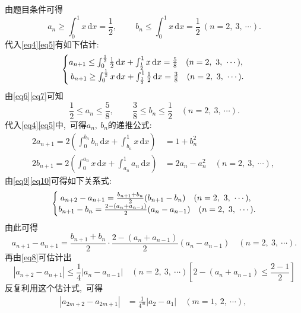 	\begin{solution}
		由题目条件可得
		\begin{equation}
			a_n\ge \int_{0}^{1}x \,\text{d}x=\frac{1}{2},\ \qquad b_n\le \int_{0}^{1}x \,\text{d}x=\frac{1}{2}\ (n=2,\ 3,\ \cdots)\label{eq6}.
		\end{equation}
		代入\eqref{eq4}\eqref{eq5}有如下估计:
		\begin{equation}
			\centering{
				\left\{\begin{matrix} 
					a_{n+1}\le \int_{0}^{\frac{1}{2}}\frac{1}{2}\,\text{d}x + \int_{\frac{1}{2}}^{1}x\,\text{d}x=\frac{5}{8}\quad (n=2,\ 3,\ \cdots),\  \\ 
					b_{n+1}\ge \int_{0}^{\frac{1}{2}}x\,\text{d}x + \int_{\frac{1}{2}}^{1}\frac{1}{2}\,\text{d}x=\frac{3}{8}\quad (n=2,\ 3,\ \cdots).\\  
				\end{matrix}\right. }\label{eq7}
		\end{equation}
		由\eqref{eq6}\eqref{eq7}可知
		\begin{equation}
			\frac{1}{2}\le a_n \le \frac{5}{8},\ \qquad\frac{3}{8}\le b_n\le \frac{1}{2}\quad (n=2,\ 3,\ \cdots).\label{eq8}
		\end{equation}
		代入\eqref{eq4}\eqref{eq5}中,\ 可得$a_n,\ b_n$的递推公式:
		\begin{align}
			2a_{n+1}=2\left(\int_{0}^{b_n}b_n\,\text{d}x+\int_{b_n}^{1}x\,\text{d}x\right)&=1+b_n^2\label{eq9}\\
			2b_{n+1}=2\left(\int_{0}^{a_n}x\,\text{d}x+\int_{a_n}^{1}a_n\,\text{d}x\right)&=2a_n-a_n^2\quad (n=2,\ 3,\ \cdots)\label{eq10},\ 
		\end{align}
		由\eqref{eq9}\eqref{eq10}可得如下关系式:
		\begin{equation}
			\centering{
				\left\{\begin{matrix} 
					a_{n+2}-a_{n+1}=\frac{b_{n+1}+b_{n}}{2}(b_{n+1}-b_n)\quad (n=2,\ 3,\ \cdots),\ \\
					b_{n+1}-b_n=\frac{2-(a_n+a_{n-1})}{2}(a_n-a_{n-1})\quad   (n=2,\ 3,\ \cdots).
				\end{matrix}\right.}\label{eq11}
		\end{equation}
		由此可得
		$$a_{n+1}-a_{n+1}=\frac{b_{n+1}+b_n}{2}\cdot \frac{2-(a_n+a_{n-1})}{2}(a_n-a_{n-1}) \quad   (n=2,\ 3,\ \cdots).$$
		再由\eqref{eq8}可估计出
		$$|a_{n+2}-a_{n+1}|\le \frac{1}{4}|a_n-a_{n-1}|\quad (n=2,\ 3,\ \cdots)\left[2-(a_n+a_{n-1})\le \frac{2-1}{2}\right]$$
		反复利用这个估计式,\ 可得
		\begin{align*}
			\left|a_{2m+2}-a_{2m+1}\right|&=\frac{1}{4^m}\left|a_2-a_1\right|\quad (m=1,\ 2,\ \cdots),\ \\

\end{align*}
\end{solution}

